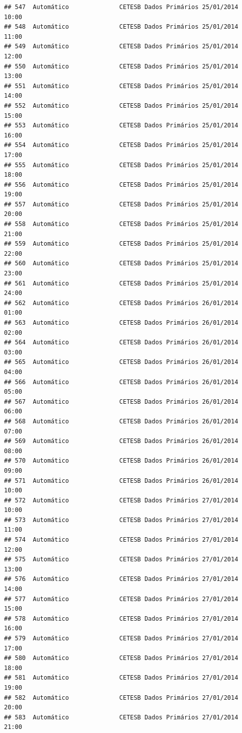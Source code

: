 \documentclass[]{book}
\begin{document}
\begin{verbatim}
## 547  Automático              CETESB Dados Primários 25/01/2014 10:00
## 548  Automático              CETESB Dados Primários 25/01/2014 11:00
## 549  Automático              CETESB Dados Primários 25/01/2014 12:00
## 550  Automático              CETESB Dados Primários 25/01/2014 13:00
## 551  Automático              CETESB Dados Primários 25/01/2014 14:00
## 552  Automático              CETESB Dados Primários 25/01/2014 15:00
## 553  Automático              CETESB Dados Primários 25/01/2014 16:00
## 554  Automático              CETESB Dados Primários 25/01/2014 17:00
## 555  Automático              CETESB Dados Primários 25/01/2014 18:00
## 556  Automático              CETESB Dados Primários 25/01/2014 19:00
## 557  Automático              CETESB Dados Primários 25/01/2014 20:00
## 558  Automático              CETESB Dados Primários 25/01/2014 21:00
## 559  Automático              CETESB Dados Primários 25/01/2014 22:00
## 560  Automático              CETESB Dados Primários 25/01/2014 23:00
## 561  Automático              CETESB Dados Primários 25/01/2014 24:00
## 562  Automático              CETESB Dados Primários 26/01/2014 01:00
## 563  Automático              CETESB Dados Primários 26/01/2014 02:00
## 564  Automático              CETESB Dados Primários 26/01/2014 03:00
## 565  Automático              CETESB Dados Primários 26/01/2014 04:00
## 566  Automático              CETESB Dados Primários 26/01/2014 05:00
## 567  Automático              CETESB Dados Primários 26/01/2014 06:00
## 568  Automático              CETESB Dados Primários 26/01/2014 07:00
## 569  Automático              CETESB Dados Primários 26/01/2014 08:00
## 570  Automático              CETESB Dados Primários 26/01/2014 09:00
## 571  Automático              CETESB Dados Primários 26/01/2014 10:00
## 572  Automático              CETESB Dados Primários 27/01/2014 10:00
## 573  Automático              CETESB Dados Primários 27/01/2014 11:00
## 574  Automático              CETESB Dados Primários 27/01/2014 12:00
## 575  Automático              CETESB Dados Primários 27/01/2014 13:00
## 576  Automático              CETESB Dados Primários 27/01/2014 14:00
## 577  Automático              CETESB Dados Primários 27/01/2014 15:00
## 578  Automático              CETESB Dados Primários 27/01/2014 16:00
## 579  Automático              CETESB Dados Primários 27/01/2014 17:00
## 580  Automático              CETESB Dados Primários 27/01/2014 18:00
## 581  Automático              CETESB Dados Primários 27/01/2014 19:00
## 582  Automático              CETESB Dados Primários 27/01/2014 20:00
## 583  Automático              CETESB Dados Primários 27/01/2014 21:00

\end{verbatim}
\end{document}
